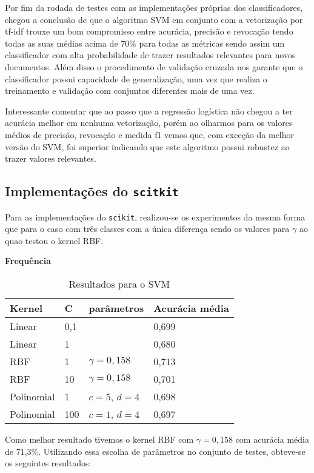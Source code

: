 Por fim da rodada de testes com as implementações próprias dos classificadores, chegou
a conclusão de que o algoritmo SVM em conjunto com a vetorização por tf-idf trouxe um bom
compromisso entre acurácia, precisão e revocação tendo todas as suas médias acima de 70\%
para todas as métricas sendo assim um classificador com alta probabilidade de trazer resultados
relevantes para novos documentos. Além disso o procedimento de validação cruzada nos garante
que o classificador possui capacidade de generalização, uma vez que realiza o treinamento e
validação com conjuntos diferentes mais de uma vez.

Interessante comentar que ao passo que a regressão logística não chegou a ter
acurácia melhor em nenhuma vetorização, porém ao olharmos para os valores médios de precisão,
revocação e medida f1 vemos que, com exceção da melhor versão do SVM, foi superior indicando
que este algoritmo possui robustez ao trazer valores relevantes.

\subsection{Implementações do \texttt{scitkit}}

Para as implementações do \texttt{scikit}, realizou-se os experimentos da mesma forma que
para o caso com três classes com a única diferença sendo os valores para $\gamma$ ao quao
testou o kernel RBF.

\textbf{Frequência}

\begin{table}[H]
	\centering
	\caption{Resultados para o SVM}
	\begin{tabular}{l l l l}
		\hline
		Kernel & C & parâmetros & Acurácia média \\
		\hline
		Linear & 0,1 & & 0,699 \\
		\hline
		Linear & 1 & & 0,680 \\
		\hline
		RBF & 1 & $\gamma = 0,158$ & 0,713 \\
		\hline
		RBF & 10 & $\gamma = 0,158$ & 0,701 \\
		\hline
		Polinomial & 1 & $c = 5$, $d = 4$ & 0,698 \\
		\hline
		Polinomial & 100 & $c = 1$, $d = 4$ & 0,697 \\
		\hline
	\end{tabular}
\end{table}

Como melhor resultado tivemos o kernel RBF com $\gamma = 0,158$ com acurácia média
de 71,3\%. Utilizando essa escolha de parâmetros no conjunto de testes, obteve-se
os seguintes resultados:

